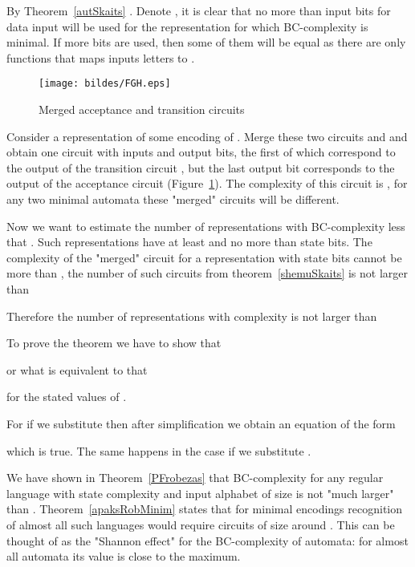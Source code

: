 \documentclass[copyright, creativecommons]{eptcs}
\newcommand{\qed}{}
\newenvironment{proof}[1][Proof]{\begin{trivlist}
\item[\hskip \labelsep {\bfseries #1}]}{\end{trivlist}}
\begin{document}
\begin{proof}
By Theorem~\ref{autSkaits} .
Denote , it is clear that no more than  input bits for data input will be used for the
representation for which BC-complexity is minimal. If more bits are used, then some of them will be equal as there
are only  functions that maps  inputs letters to .

\begin{figure}[htb]
	\centering
		\texttt{[image: bildes/FGH.eps]}
	\caption{Merged acceptance and transition circuits}
	\label{FGH}
\end{figure}

Consider a representation  of some encoding  of .
Merge these two circuits  and  and obtain one circuit  with  inputs and  output bits,
the first  of which correspond to the output of the transition circuit , but the last output bit corresponds to the output of the acceptance circuit  (Figure~\ref{FGH}).
The complexity of this circuit  is ,
for any two minimal automata these "merged" circuits will be different.

Now we want to estimate the number of representations with BC-complexity less that .
Such representations have at least  and no more than  state bits.
The complexity of the "merged" circuit  for a representation with  state bits cannot be more than ,
the number of such circuits  from theorem~\ref{shemuSkaits} is not larger than


Therefore the number of representations with complexity  is not larger than


To prove the theorem we have to show that

or what is equivalent to that

for the stated values of .

For  if we substitute  then after simplification we obtain an
equation of the form 

which is true.
The same happens in the case  if we substitute .
\qed
\end{proof}

We have shown in Theorem~\ref{PFrobezas} that BC-complexity for any regular language with state complexity 
and input alphabet of size  is not "much larger" than . Theorem~\ref{apaksRobMinim} states that for minimal
encodings recognition of almost all such languages would require circuits of size around . This can be thought of
as the "Shannon effect" for the BC-complexity of automata: for almost all automata its value is close
to the maximum.
\end{document}
